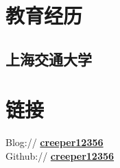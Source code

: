 \documentclass[]{deedy-resume-openfont}
\begin{document}
%
%
\lastupdated

%
%

%
%

\begin{minipage}[t]{0.25\textwidth} 


\section{教育经历} 
\sectionsep

\subsection{上海交通大学}
\sectionsep
{}
\sectionsep
{}
\sectionsep


\section{链接}
\sectionsep
Blog://  \href{https://creeper12356.github.io/}{\bf creeper12356} \\ 
Github:// \href{https://github.com/creeper12356}{\bf creeper12356} \\




\end{minipage}
\end{document}
